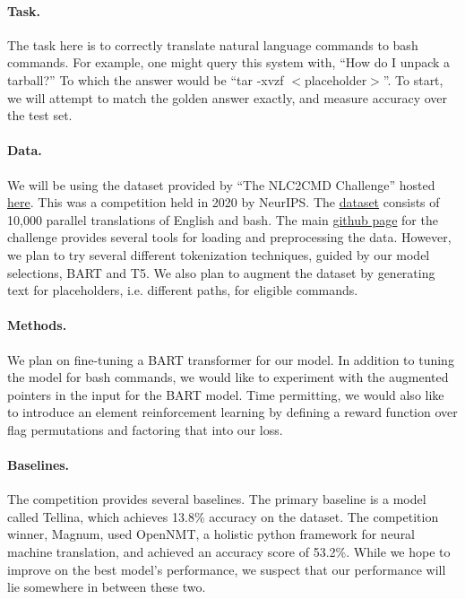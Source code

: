 \paragraph{Task.}
The task here is to correctly translate natural language commands to bash
commands. For example, one might query this system with, ``How do I unpack a
tarball?'' To which the answer would be ``tar -xvzf $<$placeholder$>$''. To
start, we will attempt to match the golden answer exactly, and measure accuracy
over the test set.

\paragraph{Data.}
We will be using the dataset provided by ``The NLC2CMD Challenge'' hosted
\href{https://nlc2cmd.us-east.mybluemix.net/}{here}. This was a competition
held in 2020 by NeurIPS. The
\href{https://github.com/IBM/clai/blob/nlc2cmd/docs/nl2bash-data.md}{dataset}
consists of 10,000 parallel translations of English and bash. The main
\href{https://github.com/IBM/clai/tree/nlc2cmd}{github page} for the challenge
provides several tools for loading and preprocessing the data. However, we plan
to try several different tokenization techniques, guided by our model
selections, BART and T5. We also plan to augment the dataset by generating text
for placeholders, i.e. different paths, for eligible commands.

\paragraph{Methods.}
We plan on fine-tuning a BART transformer for our model. In addition to tuning
the model for bash commands, we would like to experiment with the augmented
pointers in the input for the BART model. Time permitting, we would also like
to introduce an element reinforcement learning by defining a reward function
over flag permutations and factoring that into our loss.

\paragraph{Baselines.}
The competition provides several baselines. The primary baseline is a model
called Tellina, which achieves 13.8\% accuracy on the dataset. The competition
winner, Magnum, used OpenNMT, a holistic python framework for neural machine
translation, and achieved an accuracy score of 53.2\%. While we hope to improve
on the best model's performance, we suspect that our performance will lie
somewhere in between these two.

